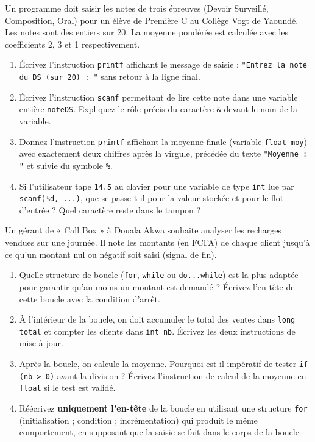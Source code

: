 \documentclass[11pt]{article}
\begin{document}
\begin{exercice}
Un programme doit saisir les notes de trois épreuves (Devoir Surveillé, Composition, Oral) pour un élève de Première C au Collège Vogt de Yaoundé. Les notes sont des entiers sur 20. La moyenne pondérée est calculée avec les coefficients 2, 3 et 1 respectivement.
\begin{enumerate}
    \item Écrivez l'instruction \texttt{printf} affichant le message de saisie : \texttt{"Entrez la note du DS (sur 20) : "} sans retour à la ligne final.
    \item Écrivez l'instruction \texttt{scanf} permettant de lire cette note dans une variable entière \texttt{noteDS}. Expliquez le rôle précis du caractère \texttt{\&} devant le nom de la variable.
    \item Donnez l'instruction \texttt{printf} affichant la moyenne finale (variable \texttt{float moy}) avec exactement deux chiffres après la virgule, précédée du texte \texttt{"Moyenne : "} et suivie du symbole \texttt{\%}.
    \item Si l'utilisateur tape \texttt{14.5} au clavier pour une variable de type \texttt{int} lue par \texttt{scanf(\%d, ...)}, que se passe-t-il pour la valeur stockée et pour le flot d'entrée ? Quel caractère reste dans le tampon ?
\end{enumerate}
\end{exercice}

\begin{exercice}
Un gérant de « Call Box » à Douala Akwa souhaite analyser les recharges vendues sur une journée. Il note les montants (en FCFA) de chaque client jusqu'à ce qu'un montant nul ou négatif soit saisi (signal de fin).
\begin{enumerate}
    \item Quelle structure de boucle (\texttt{for}, \texttt{while} ou \texttt{do...while}) est la plus adaptée pour garantir qu'au moins un montant est demandé ? Écrivez l'en-tête de cette boucle avec la condition d'arrêt.
    \item À l'intérieur de la boucle, on doit accumuler le total des ventes dans \texttt{long total} et compter les clients dans \texttt{int nb}. Écrivez les deux instructions de mise à jour.
    \item Après la boucle, on calcule la moyenne. Pourquoi est-il impératif de tester \texttt{if (nb > 0)} avant la division ? Écrivez l'instruction de calcul de la moyenne en \texttt{float} si le test est validé.
    \item Réécrivez \textbf{uniquement l'en-tête} de la boucle en utilisant une structure \texttt{for} (initialisation ; condition ; incrémentation) qui produit le même comportement, en supposant que la saisie se fait dans le corps de la boucle.
\end{enumerate}
\end{exercice}
\end{document}
